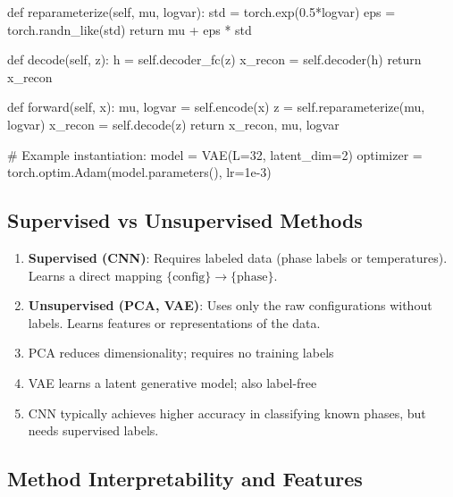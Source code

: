 \documentclass[%
oneside,                 %
final,                   %
10pt]{article}
\begin{document}
   def reparameterize(self, mu, logvar):
       std = torch.exp(0.5*logvar)
       eps = torch.randn_like(std)
       return mu + eps * std

   def decode(self, z):
       h = self.decoder_fc(z)
       x_recon = self.decoder(h)
       return x_recon

   def forward(self, x):
       mu, logvar = self.encode(x)
       z = self.reparameterize(mu, logvar)
       x_recon = self.decode(z)
       return x_recon, mu, logvar

# Example instantiation:
model = VAE(L=32, latent_dim=2)
optimizer = torch.optim.Adam(model.parameters(), lr=1e-3)

\epycod


\subsection{Supervised vs Unsupervised Methods}

\begin{enumerate}
\item \textbf{Supervised (CNN)}: Requires labeled data (phase labels or temperatures). Learns a direct mapping $\{\text{config}\}\to\{\text{phase}\}$.

\item \textbf{Unsupervised (PCA, VAE)}: Uses only the raw configurations without labels. Learns features or representations of the data.

\item PCA reduces dimensionality; requires no training labels 

\item VAE learns a latent generative model; also label-free 

\item CNN typically achieves higher accuracy in classifying known phases, but needs supervised labels.
\end{enumerate}

\noindent
\subsection{Method Interpretability and Features}
\end{document}
